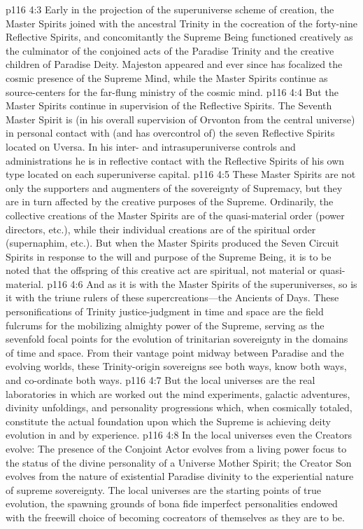 \vs p116 4:3 Early in the projection of the superuniverse scheme of creation, the Master Spirits joined with the ancestral Trinity in the cocreation of the forty\hyp{}nine Reflective Spirits, and concomitantly the Supreme Being functioned creatively as the culminator of the conjoined acts of the Paradise Trinity and the creative children of Paradise Deity. Majeston appeared and ever since has focalized the cosmic presence of the Supreme Mind, while the Master Spirits continue as source\hyp{}centers for the far\hyp{}flung ministry of the cosmic mind.
\vs p116 4:4 But the Master Spirits continue in supervision of the Reflective Spirits. The Seventh Master Spirit is (in his overall supervision of Orvonton from the central universe) in personal contact with (and has overcontrol of) the seven Reflective Spirits located on Uversa. In his inter\hyp{} and intrasuperuniverse controls and administrations he is in reflective contact with the Reflective Spirits of his own type located on each superuniverse capital.
\vs p116 4:5 These Master Spirits are not only the supporters and augmenters of the sovereignty of Supremacy, but they are in turn affected by the creative purposes of the Supreme. Ordinarily, the collective creations of the Master Spirits are of the quasi\hyp{}material order (power directors, etc.), while their individual creations are of the spiritual order (supernaphim, etc.). But when the Master Spirits  produced the Seven Circuit Spirits in response to the will and purpose of the Supreme Being, it is to be noted that the offspring of this creative act are spiritual, not material or quasi\hyp{}material.
\pc \vs p116 4:6 And as it is with the Master Spirits of the superuniverses, so is it with the triune rulers of these supercreations---the Ancients of Days. These personifications of Trinity justice\hyp{}judgment in time and space are the field fulcrums for the mobilizing almighty power of the Supreme, serving as the sevenfold focal points for the evolution of trinitarian sovereignty in the domains of time and space. From their vantage point midway between Paradise and the evolving worlds, these Trinity\hyp{}origin sovereigns see both ways, know both ways, and co\hyp{}ordinate both ways.
\pc \vs p116 4:7 But the local universes are the real laboratories in which are worked out the mind experiments, galactic adventures, divinity unfoldings, and personality progressions which, when cosmically totaled, constitute the actual foundation upon which the Supreme is achieving deity evolution in and by experience.
\vs p116 4:8 In the local universes even the Creators evolve: The presence of the Conjoint Actor evolves from a living power focus to the status of the divine personality of a Universe Mother Spirit; the Creator Son evolves from the nature of existential Paradise divinity to the experiential nature of supreme sovereignty. The local universes are the starting points of true evolution, the spawning grounds of bona fide imperfect personalities endowed with the freewill choice of becoming cocreators of themselves as they are to be.
